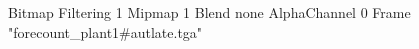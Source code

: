 {Bitmap
	{Filtering 1}
	{Mipmap 1}
	{Blend none}
	{AlphaChannel 0}
	{Frame "forecount_plant1#autlate.tga"}
}
